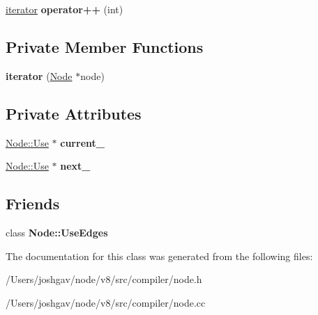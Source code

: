 \begin{DoxyCompactItemize}
\item 
\hyperlink{classv8_1_1internal_1_1compiler_1_1_node_1_1_use_edges_1_1iterator}{iterator} {\bfseries operator++} (int)\hypertarget{classv8_1_1internal_1_1compiler_1_1_node_1_1_use_edges_1_1iterator_aee7b458c8967b9663e0dfb21198226c7}{}\label{classv8_1_1internal_1_1compiler_1_1_node_1_1_use_edges_1_1iterator_aee7b458c8967b9663e0dfb21198226c7}

\end{DoxyCompactItemize}
\subsection*{Private Member Functions}
\begin{DoxyCompactItemize}
\item 
{\bfseries iterator} (\hyperlink{classv8_1_1internal_1_1compiler_1_1_node}{Node} $\ast$node)\hypertarget{classv8_1_1internal_1_1compiler_1_1_node_1_1_use_edges_1_1iterator_a12b41b3bad27b13e2fbaa67b0f10e134}{}\label{classv8_1_1internal_1_1compiler_1_1_node_1_1_use_edges_1_1iterator_a12b41b3bad27b13e2fbaa67b0f10e134}

\end{DoxyCompactItemize}
\subsection*{Private Attributes}
\begin{DoxyCompactItemize}
\item 
\hyperlink{structv8_1_1internal_1_1compiler_1_1_node_1_1_use}{Node\+::\+Use} $\ast$ {\bfseries current\+\_\+}\hypertarget{classv8_1_1internal_1_1compiler_1_1_node_1_1_use_edges_1_1iterator_a358d7f3df45b639f5735bf6877ee7f61}{}\label{classv8_1_1internal_1_1compiler_1_1_node_1_1_use_edges_1_1iterator_a358d7f3df45b639f5735bf6877ee7f61}

\item 
\hyperlink{structv8_1_1internal_1_1compiler_1_1_node_1_1_use}{Node\+::\+Use} $\ast$ {\bfseries next\+\_\+}\hypertarget{classv8_1_1internal_1_1compiler_1_1_node_1_1_use_edges_1_1iterator_af3df4c0134a0b69424ffad336bad92ae}{}\label{classv8_1_1internal_1_1compiler_1_1_node_1_1_use_edges_1_1iterator_af3df4c0134a0b69424ffad336bad92ae}

\end{DoxyCompactItemize}
\subsection*{Friends}
\begin{DoxyCompactItemize}
\item 
class {\bfseries Node\+::\+Use\+Edges}\hypertarget{classv8_1_1internal_1_1compiler_1_1_node_1_1_use_edges_1_1iterator_a16acd692e95e6390e8fadbae7e0c88b8}{}\label{classv8_1_1internal_1_1compiler_1_1_node_1_1_use_edges_1_1iterator_a16acd692e95e6390e8fadbae7e0c88b8}

\end{DoxyCompactItemize}


The documentation for this class was generated from the following files\+:\begin{DoxyCompactItemize}
\item 
/\+Users/joshgav/node/v8/src/compiler/node.\+h\item 
/\+Users/joshgav/node/v8/src/compiler/node.\+cc\end{DoxyCompactItemize}
